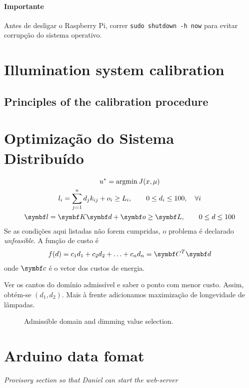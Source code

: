\documentclass[english,fira]{ist-report}
\begin{document}
\paragraph{Importante} Antes de desligar o Raspberry Pi, correr \texttt{sudo shutdown -h now} para evitar corrupção do sistema operativo.

\section{Illumination system calibration}

\subsection{Principles of the calibration procedure}





\section{Optimização do Sistema Distribuído}

\begin{gather*}
	u^* = \text{argmin}\,J(x, \mu) \\
	l_i = \sum^n_{j=1} d_j k_{ij} + o_i \geq L_i, \qquad 0 \leq d_i \leq 100, \quad \forall i \\
	\matr{l} = \matr{K}\matr{d} + \matr{o} \geq \matr{L}, \qquad 0 \leq d \leq 100
\end{gather*}
Se as condições aqui listadas não forem cumpridas, o problema é declarado \textit{unfeasible}. A função de custo é
\begin{gather*}
	f(d) = c_1d_1 + c_2d_2 + \ldots + c_nd_n = \matr{C}^T\matr{d}
\end{gather*}
onde $\matr{c}$ é o vetor dos custos de energia.

Ver os cantos do domínio admissível e saber o ponto com menor custo. Assim, obtém-se $(d_1,d_2)$. Mais à frente adicionamos maximização de longevidade de lâmpadas.
\begin{figure}[ht]
	\centering
	
	\caption{Admissible domain and dimming value selection.}
\end{figure}

\section{Arduino data fomat}

{\centering \textit{Provisory section so that Daniel can start the web-server}}
\end{document}
